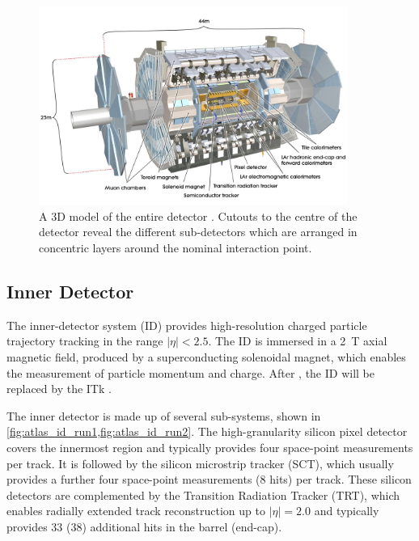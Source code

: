 \begin{figure}[!htpb]
  \centering
  \includegraphics[width=0.9\textwidth]{chapters/2.detector/figs/atlas_detector.jpg}
  \caption{
    A 3D model of the entire \ATLAS detector \cite{Jon-And:1237407}.
    Cutouts to the centre of the detector reveal the different sub-detectors which are arranged in concentric layers around the nominal interaction point.
  }
  \label{fig:atlas_detector}
\end{figure}


\subsection{Inner Detector}\label{sec:atlas_id}

The inner-detector system (ID) provides high-resolution charged particle trajectory tracking in the range $|\eta| < 2.5$.
The ID is immersed in a \SI{2}{\tesla} axial magnetic field, produced by a superconducting solenoidal magnet, which enables the measurement of particle momentum and charge.
After \runthree, the ID will be replaced by the ITk \cite{ATLAS-TDR-30,ATLAS-TDR-25}.

The inner detector is made up of several sub-systems, shown in \cref{fig:atlas_id_run1,fig:atlas_id_run2}.
The high-granularity silicon pixel detector covers the innermost region and typically provides four space-point measurements per track.
It is followed by the silicon microstrip tracker (SCT), which usually provides a further four space-point measurements (8 hits) per track.
These silicon detectors are complemented by the Transition Radiation Tracker (TRT),
which enables radially extended track reconstruction up to $|\eta| = 2.0$ and typically provides 33 (38) additional hits in the barrel (end-cap). 


